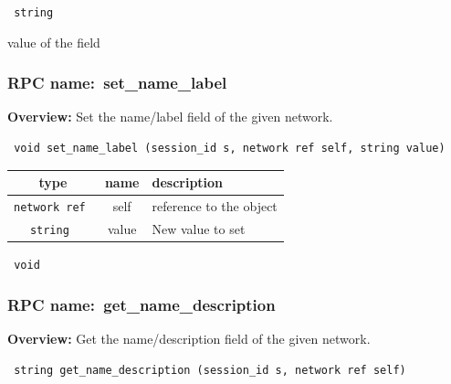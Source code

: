 \vspace{0.3cm}

{\tt 
string
}


value of the field
\vspace{0.3cm}
\vspace{0.3cm}
\vspace{0.3cm}
\subsubsection{RPC name:~set\_name\_label}

{\bf Overview:} 
Set the name/label field of the given network.

\begin{verbatim} void set_name_label (session_id s, network ref self, string value)\end{verbatim}



 
\vspace{0.3cm}
\begin{tabular}{|c|c|p{7cm}|}
 \hline
{\bf type} & {\bf name} & {\bf description} \\ \hline
{\tt network ref } & self & reference to the object \\ \hline 

{\tt string } & value & New value to set \\ \hline 

\end{tabular}

\vspace{0.3cm}

{\tt 
void
}



\vspace{0.3cm}
\vspace{0.3cm}
\vspace{0.3cm}
\subsubsection{RPC name:~get\_name\_description}

{\bf Overview:} 
Get the name/description field of the given network.

\begin{verbatim} string get_name_description (session_id s, network ref self)\end{verbatim}


